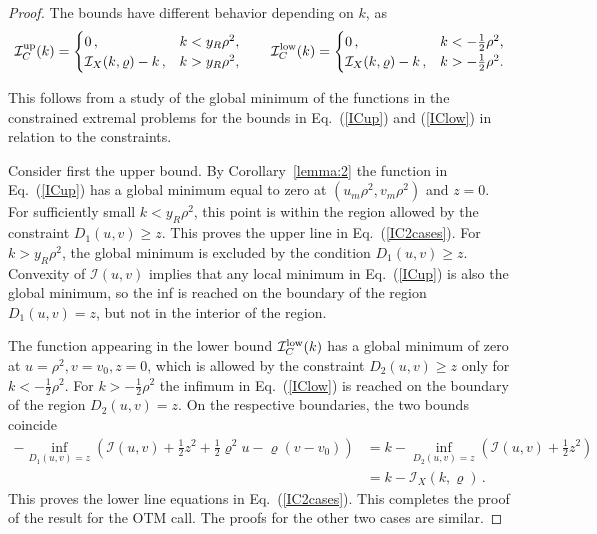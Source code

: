 \documentclass[11pt]{article}
\numberwithin{equation}{section}
\theoremstyle{plain}
\begin{document}
\begin{proof}
The bounds have different behavior depending on $k$, as 
\begin{equation}\label{IC2cases}
\mathcal{I}_C^{\rm up}(k) = 
\begin{cases}
0\,, &   k < y_R\rho^2, \\
\mathcal{I}_X(k,\varrho) - k\,, &  k > y_R\rho^2,
\end{cases}
\qquad
\mathcal{I}_C^{\rm low}(k) = 
\begin{cases}
0\,, &   k < -\frac12 \rho^2, 
\\
\mathcal{I}_X(k,\varrho) -k\,, &  k > -\frac12\rho^2. 
\end{cases}
\end{equation}

This follows from a study of the global minimum of the functions in the
constrained extremal problems for the bounds in 
Eq.~(\ref{ICup}) and (\ref{IClow}) in relation to the constraints. 

Consider first the upper bound. By Corollary~\ref{lemma:2} the function in 
Eq.~(\ref{ICup}) has a global minimum equal to
zero at $(u_m\rho^2,v_m\rho^2)$ and $z=0$. For sufficiently small $k<y_R\rho^2$, 
this point is within the region allowed by the constraint $D_1(u,v)\geq z$. 
This proves the upper line in Eq.~(\ref{IC2cases}).
For $k>y_R\rho^2$, the global minimum is excluded by the condition 
$D_1(u,v)\geq z$.
Convexity of $\mathcal{I}(u,v)$ implies that any local minimum in 
Eq.~(\ref{ICup}) is also the global minimum, so the inf is reached on the
boundary of the region $D_1(u,v)= z$, but not in the interior of the region.

The function appearing in the lower bound
$\mathcal{I}_C^{\rm low}(k)$ has a global minimum of zero at 
$u=\rho^2, v=v_0,z=0$, which is allowed by the constraint $D_2(u,v)\geq z$
only for $k < -\frac12\rho^2$. For $k>-\frac12\rho^2$ the infimum in 
Eq.~(\ref{IClow}) is reached on the boundary of the
region $D_2(u,v)= z$. On the respective boundaries, the two bounds coincide
\begin{align}
- \inf_{D_1(u,v) = z } 
\left( \mathcal{I}(u,v) + \frac12 z^2 +\frac12 \varrho^2 u - \varrho (v-v_0) \right) 
&=
k - \inf_{D_2(u,v) = z } 
\left( \mathcal{I}(u,v) + \frac12 z^2 \right) 
\\
&= k - \mathcal{I}_X(k,\varrho)\,.\nonumber
\end{align}
This proves the lower line equations in Eq.~(\ref{IC2cases}).
This completes the proof of the result for the OTM call. The proofs for 
the other two cases are similar.
\end{proof}
\end{document}

